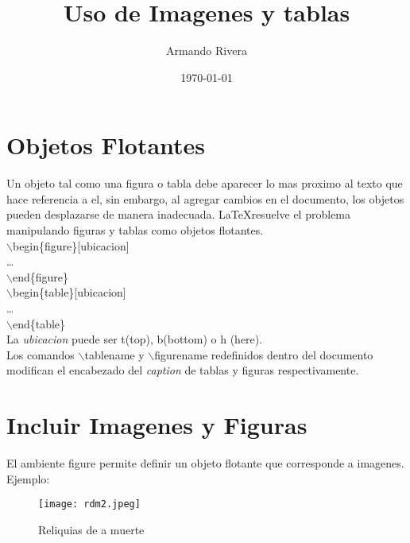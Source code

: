 \documentclass{article}
\title{Uso de Imagenes y tablas}
\author{Armando Rivera}
\date{\today}
\begin{document}
	\maketitle
	\renewcommand{\contentsname}{Tabla de contenido} %
	\renewcommand{\listfigurename}{Lista de Figuras}
	\renewcommand{\figurename}{Fig.}	%
	\renewcommand{\listtablename}{Lista de Tablas}
	\renewcommand{\tablename}{Tabla}
	
	\tableofcontents	%
	\listoffigures		%
	\listoftables

	\section{Objetos Flotantes}
	Un objeto tal como una figura o tabla debe aparecer lo mas proximo al texto que hace referencia a el, sin embargo, al agregar cambios en el documento, los objetos pueden desplazarse de manera inadecuada. \LaTeX resuelve el problema manipulando figuras y tablas como objetos flotantes.
	\\\textcolor{myGreen}{$\backslash$begin}\{figure\}[ubicacion]\\\dots\\\textcolor{myGreen}{$\backslash$end}\{figure\}\\\textcolor{myGreen}{$\backslash$begin}\{table\}[ubicacion]\\\dots\\\textcolor{myGreen}{$\backslash$end}\{table\}\\La \textit{ubicacion} puede ser \textcolor{myGreen}{t}(top), \textcolor{myGreen}{b}(bottom) o \textcolor{myGreen}{h} (here).\\Los comandos \textcolor{myGreen}{$\backslash$tablename} y \textcolor{myGreen}{$\backslash$figurename} redefinidos dentro del documento modifican el encabezado del \textit{caption} de tablas y figuras respectivamente.
	\section{Incluir Imagenes y Figuras}
	El ambiente \textcolor{myGreen}{figure} permite definir un objeto flotante que corresponde a imagenes. Ejemplo:\\
	\begin{figure}[ht]
		\centering
		\texttt{[image: rdm2.jpeg]}
		\caption{Reliquias de a muerte}
	\end{figure}
\end{document}
